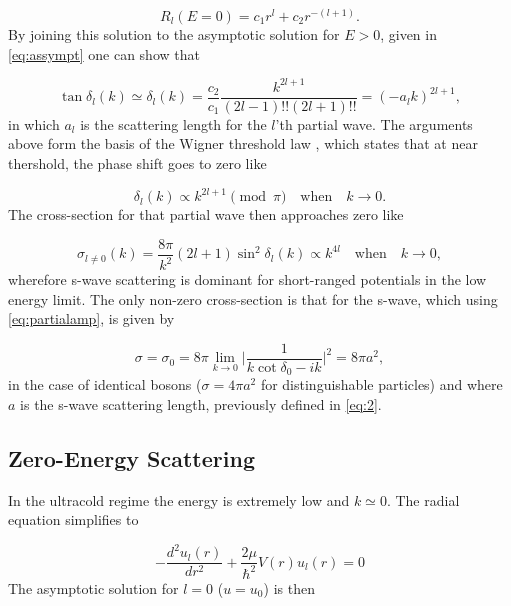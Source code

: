 \documentclass{article}
\numberwithin{equation}{section}
\numberwithin{figure}{section}
\begin{document}
\begin{equation}\label{eq:35}
R_l(E=0) = c_1r^l + c_2r^{-(l+1)}.
\end{equation}
By joining this solution to the asymptotic solution for $E>0$, given in \eqref{eq:assympt} one can show that

\begin{equation}
\tan\delta_l(k) \simeq \delta_l(k) = \frac{c_2}{c_1}\frac{k^{2l+1}}{(2l-1)!!(2l+1)!!} = (-a_lk)^{2l+1},
\end{equation}
in which $a_l$ is the scattering length for the $l$'th partial wave. The arguments above form the basis of the Wigner threshold law \cite{Landau1965Quantum,Sadeghpour_2000}, which states that at near thershold, the phase shift goes to zero like

\begin{equation}
\delta_l(k) \propto k^{2l+1} \pmod{\pi} \quad \text{when} \quad k \rightarrow 0.
\end{equation}
The cross-section for that partial wave then approaches zero like

\begin{equation}
\sigma_{l \neq 0}(k) = \frac{8\pi}{k^2}(2l+1)\sin^2\delta_l(k) \propto k^{4l} \quad \text{when} \quad k \rightarrow 0,
\end{equation}
wherefore s-wave scattering is dominant for short-ranged potentials in the low energy limit. The only non-zero cross-section is that for the s-wave, which using \eqref{eq:partialamp}, is given by

\begin{equation}
\sigma = \sigma_0 = 8\pi \lim_{k \to 0} \bigg|\frac{1}{k\cot\delta_0 -ik}\bigg|^2 = 8\pi a^2,
\end{equation}  
in the case of identical bosons ($\sigma = 4\pi a^2 $ for distinguishable particles) and where $a$ is the s-wave scattering length, previously defined in \eqref{eq:2}.

\subsection{Zero-Energy Scattering}
In the ultracold regime the energy is extremely low and $k\simeq0$. The radial equation simplifies to

\begin{equation}
-\frac{d^2 u_l(r)}{dr^2} + \frac{2\mu}{\hbar^2}V(r)u_l(r) = 0
\end{equation}
The asymptotic solution for $l=0$ ($u = u_0$) is then
\end{document}
